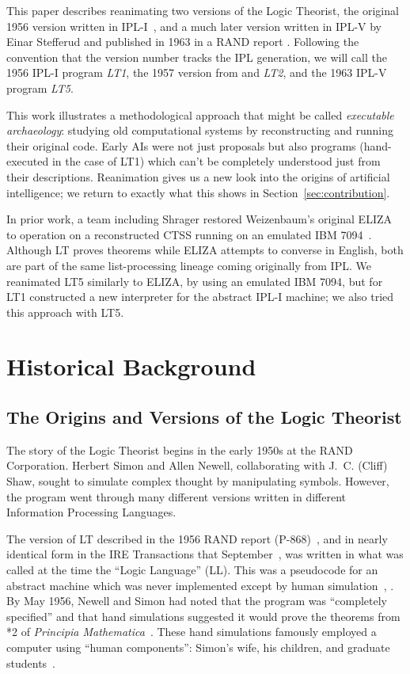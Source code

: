 \documentclass[journal]{IEEEtran}
\begin{document}
This paper describes reanimating two versions of the Logic Theorist,
the original 1956 version written in IPL-I~\cite{LT1956b}, and a much 
later version written in IPL-V by Einar Stefferud and published in 1963
in a RAND report \cite{stefferud1963lt}.  Following the convention
that the version number tracks the IPL generation, we will call the
1956 IPL-I program \emph{LT1}, the 1957 version
from \cite{LT1957} and \cite{newellshaw1957} \emph{LT2},
and the 1963 IPL-V program \emph{LT5}.

This work illustrates a methodological approach that might be called
\emph{executable archaeology}: studying old computational systems by
reconstructing and running their original code.  Early AIs were not
just proposals but also programs (hand-executed in the case of LT1)
which can't be completely understood just from their descriptions.
Reanimation gives us a new look into the origins of artificial
intelligence; we return to exactly what this shows in
Section~\ref{sec:contribution}.

In prior work, a team including Shrager restored
Weizenbaum's original ELIZA to operation on a reconstructed CTSS
running on an emulated IBM 7094~\cite{lane2025eliza}.  Although 
LT proves theorems while ELIZA attempts to converse in English,
both are part of the same list-processing lineage coming originally
from IPL.  We reanimated LT5 similarly to ELIZA, by using
an emulated IBM 7094, but for LT1 constructed a new interpreter
for the abstract IPL-I machine; we also tried this approach
with LT5.

\section{Historical Background}
\label{sec:history}

\subsection{The Origins and Versions of the Logic Theorist}

The story of the Logic Theorist begins in the early 1950s at the RAND
Corporation. Herbert Simon and Allen Newell, collaborating with
J.~C. (Cliff) Shaw, sought to simulate complex thought by manipulating
symbols. However, the program went through many different versions
written in different Information Processing Languages.

The version of LT described in the 1956 RAND report
(P-868)~\cite{LT1956a,LT1956b}, and in nearly identical form in the
IRE Transactions that September~\cite{LT1956c}, was written in what
was called at the time the ``Logic Language'' (LL).  This was a
pseudocode for an abstract machine which was never implemented
except by human simulation~\cite[Ch.~13]{simon1996models}, 
\cite[p.~xx]{newell1964ipl}.  By May
1956, Newell and Simon had noted that the program was ``completely
specified'' and that hand simulations suggested it would prove the
theorems from *2 of \textit{Principia
Mathematica}~\cite[p.~18]{cip1956}.  These hand simulations famously
employed a computer using ``human components'': Simon's wife, his children, and
graduate students~\cite[Ch.~13]{simon1996models}.
\end{document}
